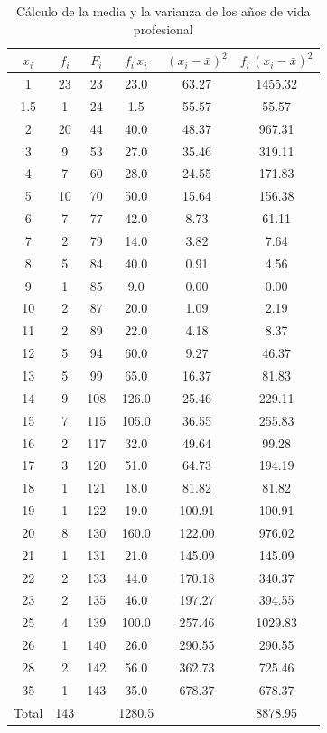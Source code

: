 \documentclass[12pt, a4paper]{article}
\newenvironment{mitabla}[2][H]{%
  \begin{table}[#1]
  \centering
  \caption{#2}
  \small
}{%
  \end{table}
}
\begin{document}
\begin{mitabla}{Cálculo de la media y la varianza de los años de vida profesional}\label{tab:real-z}
\small
\begin{tabular}{cccccc}
\toprule
\textbf{$x_i$} & \textbf{$f_i$} & \textbf{$F_i$} & \textbf{$f_i\,x_i$} & \textbf{$(x_i - \bar{x})^2$} & \textbf{$f_i\,(x_i - \bar{x})^2$} \\
\midrule
1   & 23 & 23  & 23.0  & 63.27  & 1455.32 \\
1.5 & 1  & 24  & 1.5   & 55.57  & 55.57 \\
2   & 20 & 44  & 40.0  & 48.37  & 967.31 \\
3   & 9  & 53  & 27.0  & 35.46  & 319.11 \\
4   & 7  & 60  & 28.0  & 24.55  & 171.83 \\
5   & 10 & 70  & 50.0  & 15.64  & 156.38 \\
6   & 7  & 77  & 42.0  & 8.73   & 61.11 \\
7   & 2  & 79  & 14.0  & 3.82   & 7.64 \\
8   & 5  & 84  & 40.0  & 0.91   & 4.56 \\
9   & 1  & 85  & 9.0   & 0.00   & 0.00 \\
10  & 2  & 87  & 20.0  & 1.09   & 2.19 \\
11  & 2  & 89  & 22.0  & 4.18   & 8.37 \\
12  & 5  & 94  & 60.0  & 9.27   & 46.37 \\
13  & 5  & 99  & 65.0  & 16.37  & 81.83 \\
14  & 9  & 108 & 126.0 & 25.46  & 229.11 \\
15  & 7  & 115 & 105.0 & 36.55  & 255.83 \\
16  & 2  & 117 & 32.0  & 49.64  & 99.28 \\
17  & 3  & 120 & 51.0  & 64.73  & 194.19 \\
18  & 1  & 121 & 18.0  & 81.82  & 81.82 \\
19  & 1  & 122 & 19.0  & 100.91 & 100.91 \\
20  & 8  & 130 & 160.0 & 122.00 & 976.02 \\
21  & 1  & 131 & 21.0  & 145.09 & 145.09 \\
22  & 2  & 133 & 44.0  & 170.18 & 340.37 \\
23  & 2  & 135 & 46.0  & 197.27 & 394.55 \\
25  & 4  & 139 & 100.0 & 257.46 & 1029.83 \\
26  & 1  & 140 & 26.0  & 290.55 & 290.55 \\
28  & 2  & 142 & 56.0  & 362.73 & 725.46 \\
35  & 1  & 143 & 35.0  & 678.37 & 678.37 \\
\midrule
Total & 143 & & 1280.5 & & 8878.95 \\
\bottomrule
\end{tabular}
\end{mitabla}
\end{document}
